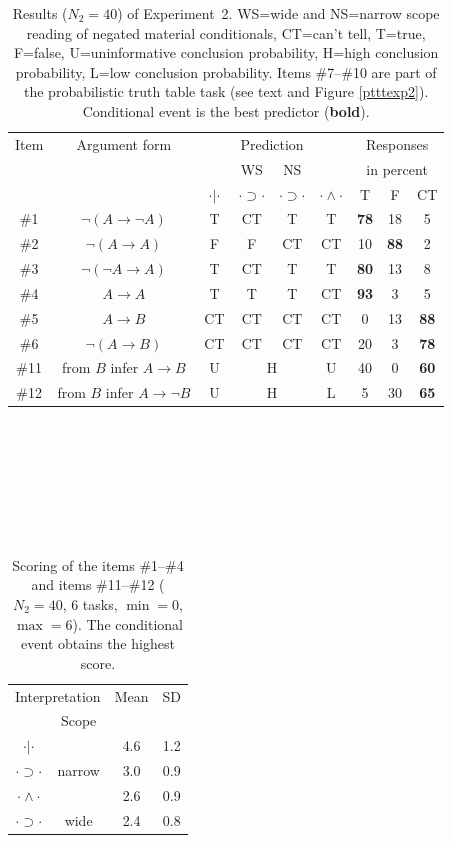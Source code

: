 \documentclass[11pt]{article}
\begin{document}
\begin{table}
\begin{center}
\begin{tabular}{ccccccccc}\hline\hline
Item & Argument
form&&\multicolumn{2}{c}{Prediction}&&\multicolumn{3}{c}{Responses}\\\cline{3-6}
&       && WS& NS&
                     &\multicolumn{3}{c}{in percent}\\\cline{7-9}
&              &  $\cdot | \cdot$&$\cdot \supset \cdot$&$\cdot \supset \cdot$&  $\cdot \wedge \cdot$ & T& F&CT\\ \hline
\#1&$\neg (A\rightarrow \neg A)$ &T&CT &T&T&{\bf 78}&18&5\\
\#2& $\neg (A\rightarrow A)$     &F&F &CT&CT&10&{\bf 88}&2\\
\#3& $\neg (\neg A\rightarrow A)$&T  &CT&T&T&{\bf 80}&13&8\\
\#4& $ A\rightarrow A$           &T&T&T&CT&{\bf 93} &3 &5 \\
\#5& $ A\rightarrow B$           &CT&CT&CT&CT&0&13&{\bf 88}\\
\#6& $ \neg(A\rightarrow  B)$      &CT&CT&CT&CT&20&3&{\bf 78}\\\cline{2-2}\cline{4-5}
\#11&from $B$ infer $A\rightarrow B$&U&\multicolumn{2}{c}{H}&U&40&0&{\bf 60}\\
\#12&from $B$ infer $A\rightarrow \neg B$&U&\multicolumn{2}{c}{H}&L&5&30&{\bf 65}\\\hline\hline
\end{tabular}
\end{center}
\caption{\label{at2} Results ($N_2=40$) of Experiment~2. WS=wide and NS=narrow scope reading of
  negated material conditionals, CT=can't tell, T=true, F=false,
  U=uninformative conclusion probability, H=high conclusion
  probability, L=low conclusion probability. Items \#7--\#10 are part
  of the probabilistic truth table task (see text and Figure
  \ref{ptttexp2}). Conditional event is the best predictor ({\bf bold}).}
\end{table}

~

 ~

 \newpage

~


~

\begin{table}
\begin{center}
\begin{tabular}{cccc}\hline\hline
\multicolumn{2}{c}{Interpretation} &{Mean}&{SD}\\\cline{1-2}
&{Scope} &&\\\hline
$\cdot | \cdot$ &&4.6&1.2\\
$\cdot \supset \cdot$& narrow&3.0&0.9\\
$\cdot \wedge \cdot$ &&2.6&0.9\\
$\cdot \supset \cdot$& wide&2.4&0.8\\\hline\hline
\end{tabular}
\end{center}
\caption{\label{scoring}  Scoring of the items  \#1--\#4 and
  items \#11--\#12 ($N_2=40$, 6 tasks,
  $\min=0$, $\max=6$). The conditional event obtains the highest score.}
\end{table}
\end{document}
